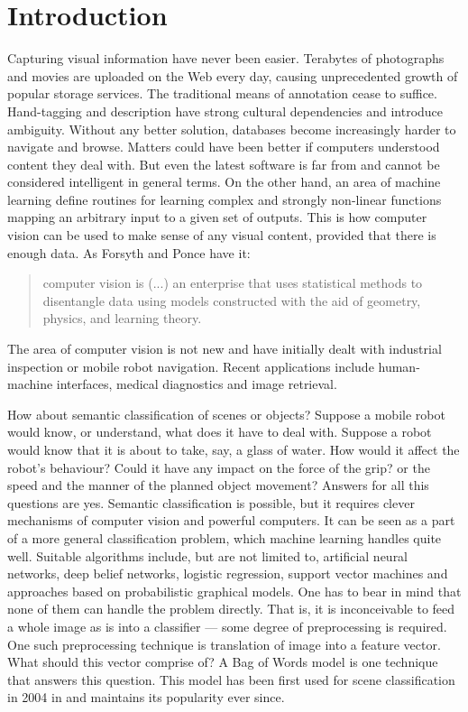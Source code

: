 \chapter{Introduction}

	
	Capturing visual information have never been easier. Terabytes of photographs and movies are uploaded on the Web every day, causing unprecedented growth of popular storage services. The traditional means of annotation cease to suffice. Hand-tagging and description have strong cultural dependencies and introduce ambiguity. Without any better solution, databases become increasingly harder to navigate and browse. Matters could have been better if computers understood content they deal with. But even the latest software is far from and cannot be considered intelligent in general terms. On the other hand, an area of machine learning define routines for learning complex and strongly non-linear functions mapping an arbitrary input to a given set of outputs. This is how computer vision can be used to make sense of any visual content, provided that there is enough data. As Forsyth and Ponce \cite{ponce2011cv} have it: 
	
	\begin{quote} 
		computer vision is (...) an enterprise that uses statistical methods to disentangle data using models constructed with the aid of geometry, physics, and learning theory.
	\end{quote} 
	
	The area of computer vision is not new and have initially dealt with industrial inspection or mobile robot navigation. Recent applications include human-machine interfaces, medical diagnostics and image retrieval.
	
	How about semantic classification of scenes or objects? Suppose a mobile robot would know, or understand, what does it have to deal with. Suppose a robot would know that it is about to take, say, a glass of water. How would it affect the robot's behaviour? Could it have any impact on the force of the grip? or the speed and the manner of the planned object movement? Answers for all this questions are yes. Semantic classification is possible, but it requires clever mechanisms of computer vision and powerful computers. It can be seen as a part of a more general classification problem, which machine learning handles quite well. Suitable algorithms include, but are not limited to, artificial neural networks, deep belief networks, logistic regression, support vector machines and approaches based on probabilistic graphical models. One has to bear in mind that none of them can handle the problem directly. That is, it is inconceivable to feed a whole image as is into a classifier --- some degree of preprocessing is required. One such preprocessing technique is translation of image into a feature vector. What should this vector comprise of? A Bag of Words model is one technique that answers this question. This model has been first used for scene classification in 2004 in \cite{csurka2004visual} and maintains its popularity ever since.
	
